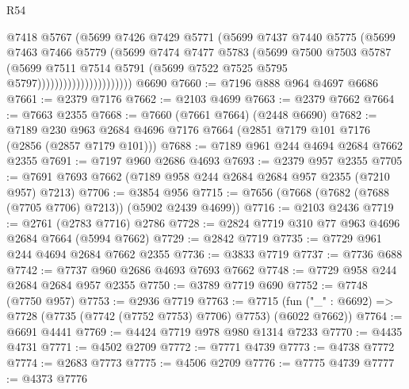 \begin{lexlean}{R54}
\begin{coremodule}
                                  @7418
                                  @5767
                                  (@5699
                                    @7426
                                    @7429
                                    @5771
                                    (@5699
                                      @7437
                                      @7440
                                      @5775
                                      (@5699
                                        @7463
                                        @7466
                                        @5779
                                        (@5699
                                          @7474
                                          @7477
                                          @5783
                                          (@5699
                                            @7500
                                            @7503
                                            @5787
                                            (@5699
                                              @7511
                                              @7514
                                              @5791
                                              (@5699 @7522 @7525 @5795 @5797))))))))))))))))))))))
    @6690
@7660 := @7196 @888 @964 @4697 @6686
@7661 := @2379 @7176
@7662 := @2103 @4699
@7663 := @2379 @7662
@7664 := @7663 @2355
@7668 := @7660 (@7661 @7664) (@2448 @6690)
@7682 := @7189 @230 @963 @2684 @4696 @7176 @7664 (@2851 @7179 @101 @7176 (@2856 (@2857 @7179 @101)))
@7688 := @7189 @961 @244 @4694 @2684 @7662 @2355
@7691 := @7197 @960 @2686 @4693
@7693 := @2379 @957 @2355
@7705 := @7691 @7693 @7662 (@7189 @958 @244 @2684 @2684 @957 @2355 (@7210 @957) @7213)
@7706 := @3854 @956
@7715 := @7656 (@7668 (@7682 (@7688 (@7705 @7706) @7213)) (@5902 @2439 @4699))
@7716 := @2103 @2436
@7719 := @2761 (@2783 @7716) @2786
@7728 := @2824 @7719 @310 @77 @963 @4696 @2684 @7664 (@5994 @7662)
@7729 := @2842 @7719
@7735 := @7729 @961 @244 @4694 @2684 @7662 @2355
@7736 := @3833 @7719
@7737 := @7736 @688
@7742 := @7737 @960 @2686 @4693 @7693 @7662
@7748 := @7729 @958 @244 @2684 @2684 @957 @2355
@7750 := @3789 @7719 @690
@7752 := @7748 (@7750 @957)
@7753 := @2936 @7719
@7763 := @7715 (fun ("_" : @6692) => @7728 (@7735 (@7742 (@7752 @7753) @7706) @7753) (@6022 @7662))
@7764 := @6691 @4441
@7769 := @4424 @7719 @978 @980 @1314 @7233
@7770 := @4435 @4731
@7771 := @4502 @2709
@7772 := @7771 @4739
@7773 := @4738 @7772
@7774 := @2683 @7773
@7775 := @4506 @2709
@7776 := @7775 @4739
@7777 := @4373 @7776

\end{coremodule}
\end{lexlean}
